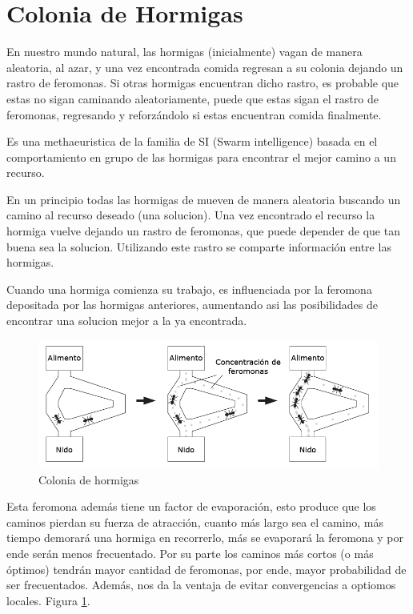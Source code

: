 \section{Colonia de Hormigas}
\label{sec:intro}

En nuestro mundo natural, las hormigas (inicialmente) vagan de manera aleatoria, al azar, y una vez encontrada comida regresan a su colonia dejando un rastro de feromonas. Si otras hormigas encuentran dicho rastro, es probable que estas no sigan caminando aleatoriamente, puede que estas sigan el rastro de feromonas, regresando y reforzándolo si estas encuentran comida finalmente.


Es una methaeuristica de la familia de SI (Swarm intelligence) basada en el comportamiento en grupo de las hormigas para encontrar el mejor camino a un recurso.

En un principio todas las hormigas de mueven de manera aleatoria buscando un camino al recurso deseado (una solucion). Una vez encontrado el recurso la hormiga vuelve dejando un rastro de feromonas, que puede depender de que tan buena sea la solucion. Utilizando este rastro se comparte información entre las hormigas.

Cuando una hormiga comienza su trabajo, es influenciada por la feromona depositada por las hormigas anteriores, aumentando asi las posibilidades de encontrar una solucion mejor a la ya encontrada.

\begin{figure}[h]
	\centering
	\includegraphics[scale=0.4]{./img/colonia_ejemplo.png}
	\caption{Colonia de hormigas}
	\label{img:ants}
\end{figure}

Esta feromona además tiene un factor de evaporación, esto produce que los caminos pierdan
su fuerza de atracción, cuanto más largo sea el camino, más tiempo demorará una hormiga
en recorrerlo, más se evaporará la feromona y por ende serán menos frecuentado. Por su parte
los caminos más cortos (o más óptimos) tendrán mayor cantidad de feromonas, por ende, mayor
probabilidad de ser frecuentados. Además, nos da la ventaja de evitar convergencias a optiomos locales.
Figura \ref{img:ants}.

